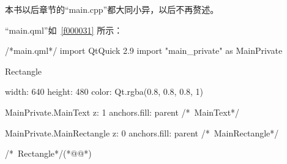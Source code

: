 本书以后章节的“main.cpp”都大同小异，以后不再赘述。


“main.qml”如\filesourcenumbernameone\ \ref{f000031}
所示：

\label{f000031}    %
\FloatBarrier                                  %
\begin{thebookfilesourceone}[escapeinside={(*@}{@*)},
caption=GoodLuck,
title=\filesourcenumbernameone \thefilesourcenumber
]
/*main.qml*/
import QtQuick 2.9
import "main_private" as MainPrivate

Rectangle {

    width: 640
    height: 480
    color: Qt.rgba(0.8, 0.8, 0.8, 1)

    MainPrivate.MainText {
        z: 1
        anchors.fill: parent
    } /*~MainText*/

    MainPrivate.MainRectangle {
        z: 0
        anchors.fill: parent
    } /*~MainRectangle*/
} /*~Rectangle*/(*@\marginpar[\hfill\setlength\fboxsep{2pt}\fbox{\footnotesize{\kaishu\parbox{1em}{\setlength{\baselineskip}{2pt}\filesourcenumbernameone}}\footnotesize{\thefilesourcenumber}}]{\setlength\fboxsep{2pt}\fbox{\footnotesize{\kaishu\parbox{1em}{\setlength{\baselineskip}{2pt}\filesourcenumbernameone}}\footnotesize{\thefilesourcenumber}}}@*)\end{thebookfilesourceone}          %
\addtocounter{lstlisting}{-1}   %

